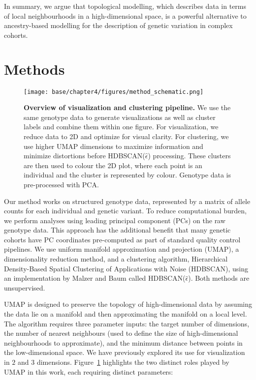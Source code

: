 In summary, we argue that topological modelling, which describes data in terms of local neighbourhoods in a high-dimensional space, is a powerful alternative to ancestry-based modelling for the description of genetic variation in complex cohorts.

\clearpage

\section{Methods}

\begin{figure}[!ht]
  \centering
  \texttt{[image: base/chapter4/figures/method\_schematic.png]}
  \caption[Overview of visualization and clustering pipeline]{\textbf{Overview of visualization and clustering pipeline.} We use the same genotype data to generate visualizations as well as cluster labels and combine them within one figure. For visualization, we reduce data to 2D and optimize for visual clarity. For clustering, we use higher UMAP dimensions to maximize information and minimize distortions before HDBSCAN($\hat{\epsilon}$) processing. These clusters are then used to colour the 2D plot, where each point is an individual and the cluster is represented by colour. Genotype data is pre-processed with PCA.}
    \label{fig:method}
\end{figure}

\clearpage

Our method works on structured genotype data, represented by a matrix of allele counts for each individual and genetic variant. To reduce computational burden, we perform analyses using leading principal component (PCs) on the raw genotype data. This approach has the additional benefit that many genetic cohorts have PC coordinates pre-computed as part of standard quality control pipelines. We use uniform manifold approximation and projection (UMAP)\citep{mcinnes_umap_2020}, a dimensionality reduction method, and a clustering algorithm, Hierarchical Density-Based Spatial Clustering of Applications with Noise (HDBSCAN), using an implementation by Malzer and Baum called HDBSCAN($\hat{\epsilon}$)\citep{malzer_hybrid_2020}. Both methods are unsupervised.

UMAP is designed to preserve the topology of high-dimensional data by assuming the data lie on a manifold and then approximating the manifold on a local level\citep{mcinnes_umap_2020}. The algorithm requires three parameter inputs: the target number of dimensions, the number of nearest neighbours (used to define the size of high-dimensional neighbourhoods to approximate), and the minimum distance between points in the low-dimensional space. We have previously explored its use for visualization in $2$ and $3$ dimensions\citep{diaz-papkovich_umap_2019}. Figure~\ref{fig:method} highlights the two distinct roles played by UMAP in this work, each requiring distinct parameters:  

